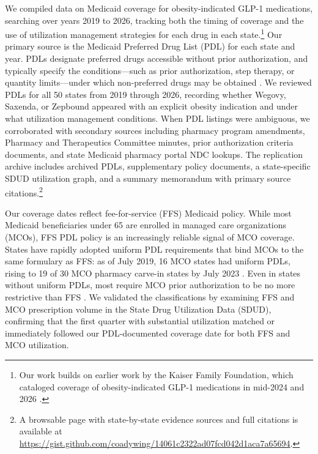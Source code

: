 We compiled data on Medicaid coverage for obesity-indicated GLP-1 medications, searching over years 2019 to 2026, tracking both the timing of coverage and the use of utilization management strategies for each drug in each state.\footnote{Our work builds on earlier work by the Kaiser Family Foundation, which cataloged coverage of obesity-indicated GLP-1 medications in mid-2024 and 2026 \citep{kff2024glp1,williams2026KFF}.} Our primary source is the Medicaid Preferred Drug List (PDL) for each state and year. PDLs designate preferred drugs accessible without prior authorization, and typically specify the conditions---such as prior authorization, step therapy, or quantity limits---under which non-preferred drugs may be obtained \citep{simon_etal_2009, dolan_tian_2019}. We reviewed PDLs for all 50 states from 2019 through 2026, recording whether Wegovy, Saxenda, or Zepbound appeared with an explicit obesity indication and under what utilization management conditions. When PDL listings were ambiguous, we corroborated with secondary sources including pharmacy program amendments, Pharmacy and Therapeutics Committee minutes, prior authorization criteria documents, and state Medicaid pharmacy portal NDC lookups. The replication archive includes archived PDLs, supplementary policy documents, a state-specific SDUD utilization graph, and a summary memorandum with primary source citations.\footnote{A browsable page with state-by-state evidence sources and full citations is available at \url{https://gist.github.com/coadywing/14061c2322ad07fcd042d1aca7a65694}.}

Our coverage dates reflect fee-for-service (FFS) Medicaid policy. While most Medicaid beneficiaries under 65 are enrolled in managed care organizations (MCOs), FFS PDL policy is an increasingly reliable signal of MCO coverage. States have rapidly adopted uniform PDL requirements that bind MCOs to the same formulary as FFS: as of July 2019, 16 MCO states had uniform PDLs, rising to 19 of 30 MCO pharmacy carve-in states by July 2023 \citep{gifford_etal_2020, healthmanagement_2024}. Even in states without uniform PDLs, most require MCO prior authorization to be no more restrictive than FFS \citep{gifford_etal_2020}. We validated the classifications by examining FFS and MCO prescription volume in the State Drug Utilization Data (SDUD), confirming that the first quarter with substantial utilization matched or immediately followed our PDL-documented coverage date for both FFS and MCO utilization.

